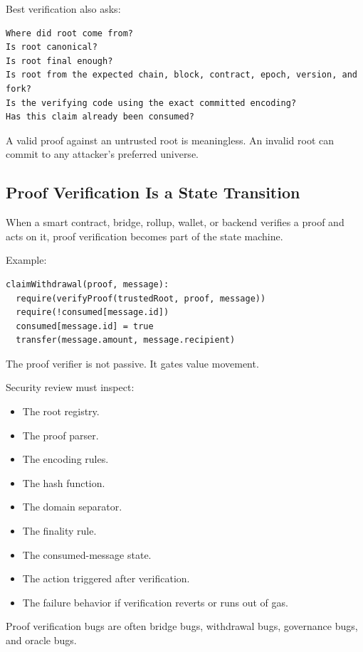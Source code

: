 Best verification also asks:

\begin{lstlisting}
Where did root come from?
Is root canonical?
Is root final enough?
Is root from the expected chain, block, contract, epoch, version, and fork?
Is the verifying code using the exact committed encoding?
Has this claim already been consumed?
\end{lstlisting}

A valid proof against an untrusted root is meaningless. An invalid root
can commit to any attacker's preferred universe.

\subsection{Proof Verification Is a State Transition}

When a smart contract, bridge, rollup, wallet, or backend verifies a
proof and acts on it, proof verification becomes part of the state
machine.

Example:

\begin{lstlisting}
claimWithdrawal(proof, message):
  require(verifyProof(trustedRoot, proof, message))
  require(!consumed[message.id])
  consumed[message.id] = true
  transfer(message.amount, message.recipient)
\end{lstlisting}

The proof verifier is not passive. It gates value movement.

Security review must inspect:

\begin{itemize}
\tightlist
\item
  The root registry.
\item
  The proof parser.
\item
  The encoding rules.
\item
  The hash function.
\item
  The domain separator.
\item
  The finality rule.
\item
  The consumed-message state.
\item
  The action triggered after verification.
\item
  The failure behavior if verification reverts or runs out of gas.
\end{itemize}

Proof verification bugs are often bridge bugs, withdrawal bugs,
governance bugs, and oracle bugs.

